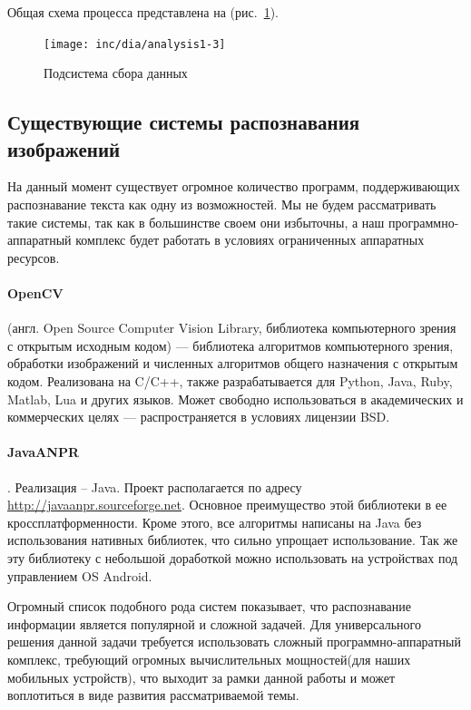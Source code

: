 Общая схема процесса представлена на (рис.~\ref{fig:fig03}).
\begin{figure}[ht]
	\centering
	\texttt{[image: inc/dia/analysis1-3]}
	\caption{Подсистема сбора данных}
  \label{fig:fig03}
\end{figure}

\subsection{Существующие системы распознавания изображений}

На данный момент существует огромное количество программ, поддерживающих распознавание текста как одну из возможностей. Мы не будем рассматривать такие системы, так как в большинстве своем они избыточны, а наш программно-аппаратный комплекс будет работать в условиях ограниченных аппаратных ресурсов.

\paragraph{OpenCV} (англ. Open Source Computer Vision Library, библиотека компьютерного зрения с открытым исходным кодом) — библиотека алгоритмов компьютерного зрения, обработки изображений и численных алгоритмов общего назначения с открытым кодом. Реализована на C/C++, также разрабатывается для Python, Java, Ruby, Matlab, Lua и других языков. Может свободно использоваться в академических и коммерческих целях — распространяется в условиях лицензии BSD.

\paragraph{JavaANPR}. Реализация – Java. Проект располагается по адресу \url{http://javaanpr.sourceforge.net}. Основное преимущество этой библиотеки в ее кроссплатформенности. Кроме этого, все алгоритмы написаны на Java без использования нативных библиотек, что сильно упрощает использование. Так же эту библиотеку с небольшой доработкой можно использовать на устройствах под управлением OS Android.

Огромный список подобного рода систем показывает, что распознавание информации является популярной и сложной задачей. Для универсального решения данной задачи требуется использовать сложный программно-аппаратный комплекс, требующий огромных вычислительных мощностей(для наших мобильных устройств), что выходит за рамки данной работы и может воплотиться в виде развития рассматриваемой темы. 

